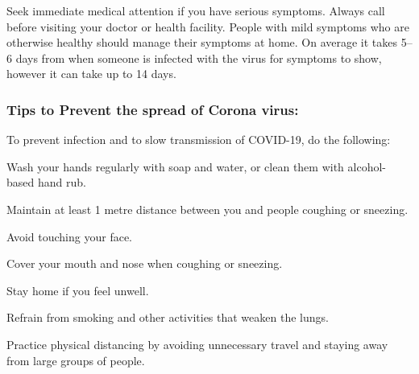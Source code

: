 \documentclass[
]{article}
\begin{document}
Seek immediate medical attention if you have serious symptoms. Always
call before visiting your doctor or health facility. People with mild
symptoms who are otherwise healthy should manage their symptoms at home.
On average it takes 5--6 days from when someone is infected with the
virus for symptoms to show, however it can take up to 14 days.

\hypertarget{tips-to-prevent-the-spread-of-corona-virus}{%
\subsubsection{Tips to Prevent the spread of Corona
virus:}\label{tips-to-prevent-the-spread-of-corona-virus}}

To prevent infection and to slow transmission of COVID-19, do the
following:

Wash your hands regularly with soap and water, or clean them with
alcohol-based hand rub.

Maintain at least 1 metre distance between you and people coughing or
sneezing.

Avoid touching your face.

Cover your mouth and nose when coughing or sneezing.

Stay home if you feel unwell.

Refrain from smoking and other activities that weaken the lungs.

Practice physical distancing by avoiding unnecessary travel and staying
away from large groups of people.
\end{document}
